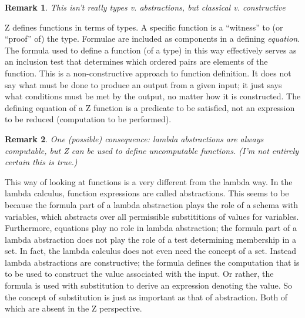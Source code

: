 \documentclass[12pt]{tufte-handout}
\numberwithin{equation}{subsection}
\numberwithin{equation}{subsection}
\newtheorem{remark}{Remark}
\begin{document}
  \begin{remark}
    This isn't really types v. abstractions, but classical v. constructive
  \end{remark}

  Z defines functions in terms of types.  A specific function is a
  ``witness'' to (or ``proof'' of) the type.  Formulae are included as
  components in a defining \textit{equation}.  The formula used to
  define a function (of a type) in this way effectively serves as an
  inclusion test that determines which ordered pairs are elements of
  the function.  This is a non-constructive approach to function
  definition.  It does not say what must be done to produce an output
  from a given input; it just says what conditions must be met by the
  output, no matter how it is constructed.  The defining equation of a
  Z function is a predicate to be satisfied, not an expression to be
  reduced (computation to be performed).

  \begin{remark}
    One (possible) consequence: lambda abstractions are always
    computable, but Z can be used to define uncomputable functions.
    (I'm not entirely certain this is true.)
  \end{remark}

  This way of looking at functions is a very different from the lambda
  way.  In the lambda calculus, function expressions are called
  abstractions.  This seems to be because the formula part of a lambda
  abstraction plays the role of a schema with variables, which
  abstracts over all permissible substititions of values for
  variables.  Furthermore, equations play no role in lambda
  abstraction; the formula part of a lambda abstraction does not play
  the role of a test determining membership in a set.  In fact, the
  lambda calculus does not even need the concept of a
  set.  Instead lambda abstractions are constructive; the formula
  defines the computation that is to be used to construct the value
  associated with the input.  Or rather, the formula is used with
  substitution to derive an expression denoting the value.  So the
  concept of substitution is just as important as that of abstraction.
  Both of which are absent in the Z perspective.
\end{document}
